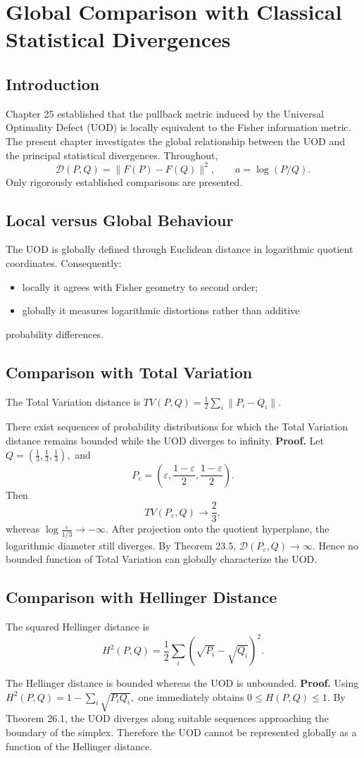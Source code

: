 \chapter[Global Comparison]{Global Comparison with Classical Statistical Divergences}
\section{Introduction}
Chapter 25 established that the pullback metric induced by the Universal
Optimality Defect (UOD) is locally equivalent to the Fisher information
metric. The present chapter investigates the global relationship between
the UOD and the principal statistical divergences.
Throughout,
\[ \mathcal{D}(P,Q)=\|F(P)-F(Q)\|^{2}, \qquad
a=\log(P/Q). \]
Only rigorously established comparisons are presented.
\section{Local versus Global Behaviour}
The UOD is globally defined through Euclidean distance in logarithmic
quotient coordinates. Consequently:
\begin{itemize}
  \item locally it agrees with Fisher geometry to second order;
  \item globally it measures logarithmic distortions rather than additive
\end{itemize}
    probability differences.
\section{Comparison with Total Variation}
The Total Variation distance is
$TV(P,Q)=\frac12\sum_{i}\|P_i-Q_i\|.$
\begin{theorem}
\label{ch:thm:26-1}
There exist sequences of probability distributions for which the Total
Variation distance remains bounded while the UOD diverges to infinity.
\textbf{Proof.}
Let
$Q=\left(\frac13,\frac13,\frac13\right),$
and
\[ P_\varepsilon= \left( \varepsilon,
\frac{1-\varepsilon}{2}, \frac{1-\varepsilon}{2}
\right). \]
Then
\[ TV(P_\varepsilon,Q)\longrightarrow\frac23,
\]
whereas
$\log\frac{\varepsilon}{1/3}\longrightarrow-\infty.$
After projection onto the quotient hyperplane, the logarithmic diameter
still diverges. By Theorem 23.5,
$\mathcal{D}(P_\varepsilon,Q)\longrightarrow\infty.$
Hence no bounded function of Total Variation can globally characterize
the UOD. 
\end{theorem}
\section{Comparison with Hellinger Distance}
The squared Hellinger distance is
\[ H^{2}(P,Q)= \frac12
\sum_{i}(\sqrt{P_i}-\sqrt{Q_i})^{2}. \]
\begin{theorem}
\label{ch:thm:26-2}
The Hellinger distance is bounded whereas the UOD is unbounded.
\textbf{Proof.}
Using
$H^{2}(P,Q) = 1-\sum_{i}\sqrt{P_iQ_i},$
one immediately obtains
$0\le H(P,Q)\le1.$
By Theorem 26.1, the UOD diverges along suitable sequences approaching
the boundary of the simplex. Therefore the UOD cannot be represented
globally as a function of the Hellinger distance. 
\end{theorem}
